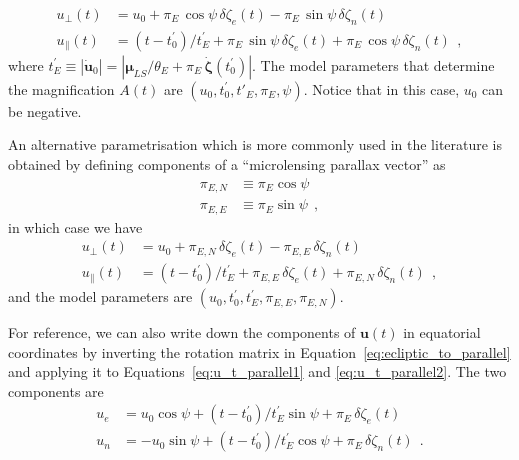 \documentclass[12pt,dvipsnames]{report}
\newcommand{\hquad}{~~}
\begin{document}
\begin{align}
    u_\bot(t)      & = u_0 + \pi_E\,\cos\psi\,\delta \zeta_e(t) - \pi_E\,\sin\psi\,\delta \zeta_n(t)
    \label{eq:u_t_parallel1}                                                                         \\
    u_\parallel(t) & =(t-t_0^\prime)/t_E^\prime + \pi_E\,\sin\psi\,\delta \zeta_e(t) +
    \pi_E\,\cos\psi\,\delta \zeta_n(t) \label{eq:u_t_parallel2}
    \hquad,
\end{align}
where $t_E^\prime \equiv|\dot{\mathbf{u}}_0|=|\boldsymbol\mu_{LS}/\theta_E  + \pi_E\,\dot{\boldsymbol \zeta}(t_0^\prime)|$.
The model parameters that determine the magnification $A(t)$ are 
$\left(u_0,t_0^\prime,t'_E,\pi_E,\psi\right)$. Notice that in this case, $u_0$
can be negative.

An alternative parametrisation which is more commonly used in the literature is obtained by
defining components of a ``microlensing parallax vector'' as
\begin{align}
    \pi_{E,N} & \equiv \pi_E\cos\psi \\
    \pi_{E,E} & \equiv \pi_E\sin\psi
    \hquad,
\end{align}
in which case we have
\begin{align}
    u_\bot(t)      & = u_0 + \pi_{E,N}\,\delta \zeta_e(t) - \pi_{E,E}\,\delta \zeta_n(t) \\
    u_\parallel(t) & =(t-t_0^\prime)/t_E^\prime + \pi_{E,E}\,\delta\zeta_e(t) +
    \pi_{E,N}\,\delta\zeta_n(t)
    \hquad,
\end{align}
and the model parameters are $\left(u_0,t_0^\prime,t_E^\prime,\pi_{E,E},\pi_{E,N}\right)$.

For reference, we can also write down the components of $\mathbf{u}(t)$ in
equatorial coordinates by inverting the rotation matrix in
Equation~\ref{eq:ecliptic_to_parallel} and applying it to
Equations~\ref{eq:u_t_parallel1} and \ref{eq:u_t_parallel2}. 
The two components are 
\begin{align}
    u_e & =u_0\cos\psi + (t-t_0^\prime)/t_E^\prime\sin\psi + \pi_E\,\delta\zeta_e(t)  
    \label{eq:u_t_east}\\
    u_n & =-u_0\sin\psi + (t-t_0^\prime)/t_E^\prime\cos\psi + \pi_E\,\delta\zeta_n(t)
    \hquad.
    \label{eq:u_t_north}
\end{align}
\end{document}
